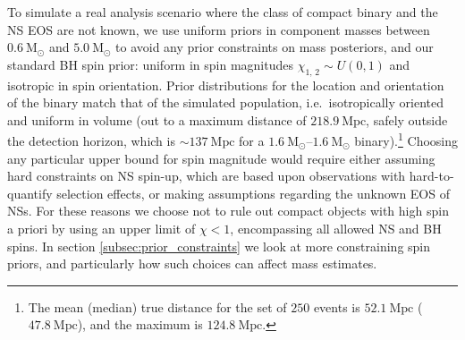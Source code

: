 To simulate a real analysis scenario where the class of compact binary and the NS EOS are not known, we use uniform priors in component masses between $0.6~\mathrm{M}_\odot$ and $5.0~\mathrm{M}_\odot$ to avoid any prior constraints on mass posteriors, and our standard BH spin prior: uniform in spin magnitudes $\chi_{1,\,2} \sim U(0, 1)$ and isotropic in spin orientation. Prior distributions for the location and orientation of the binary match that of the simulated population, i.e.\ isotropically oriented and uniform in volume (out to a maximum distance of $218.9~\mathrm{Mpc}$, safely outside the detection horizon, which is $\sim137~\mathrm{Mpc}$ for a $1.6~\mathrm{M}_\odot$--$1.6~\mathrm{M}_\odot$ binary).\footnote{The mean (median) true distance for the set of $250$ events is $52.1~\mathrm{Mpc}$ ($47.8~\mathrm{Mpc}$), and the maximum is $124.8~\mathrm{Mpc}$.}  Choosing any particular upper bound for spin magnitude would require either assuming hard constraints on NS spin-up, which are based upon observations with hard-to-quantify selection effects, or making assumptions regarding the unknown EOS of NSs. For these reasons we choose not to rule out compact objects with high spin a priori by using an upper limit of $\chi < 1$, encompassing all allowed NS and BH spins.  In section \ref{subsec:prior_constraints} we look at more constraining spin priors, and particularly how such choices can affect mass estimates.

